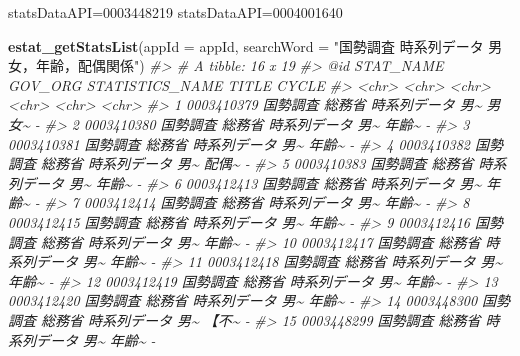 \documentclass[
  xelatex, ja=standard]{bxjsbook}
\newenvironment{Shaded}{\begin{snugshade}}{\end{snugshade}}
\newcommand{\AttributeTok}[1]{\textcolor[rgb]{0.13,0.29,0.53}{#1}}
\newcommand{\CommentTok}[1]{\textcolor[rgb]{0.56,0.35,0.01}{\textit{#1}}}
\newcommand{\FunctionTok}[1]{\textcolor[rgb]{0.13,0.29,0.53}{\textbf{#1}}}
\newcommand{\NormalTok}[1]{#1}
\newcommand{\StringTok}[1]{\textcolor[rgb]{0.31,0.60,0.02}{#1}}
\theoremstyle{definition}
\theoremstyle{definition}
\theoremstyle{definition}
\theoremstyle{definition}
\theoremstyle{remark}
\begin{document}
statsDataAPI=0003448219 statsDataAPI=0004001640

\begin{Shaded}
\begin{Highlighting}[]
\FunctionTok{estat\_getStatsList}\NormalTok{(}\AttributeTok{appId =}\NormalTok{ appId, }\AttributeTok{searchWord =} \StringTok{"国勢調査 時系列データ 男女，年齢，配偶関係"}\NormalTok{)}
\CommentTok{\#\textgreater{} \# A tibble: 16 x 19}
\CommentTok{\#\textgreater{}    \textasciigrave{}@id\textasciigrave{}      STAT\_NAME GOV\_ORG STATISTICS\_NAME  TITLE CYCLE}
\CommentTok{\#\textgreater{}    \textless{}chr\textgreater{}      \textless{}chr\textgreater{}     \textless{}chr\textgreater{}   \textless{}chr\textgreater{}            \textless{}chr\textgreater{} \textless{}chr\textgreater{}}
\CommentTok{\#\textgreater{}  1 0003410379 国勢調査  総務省  時系列データ 男\textasciitilde{} 男女\textasciitilde{} {-}    }
\CommentTok{\#\textgreater{}  2 0003410380 国勢調査  総務省  時系列データ 男\textasciitilde{} 年齢\textasciitilde{} {-}    }
\CommentTok{\#\textgreater{}  3 0003410381 国勢調査  総務省  時系列データ 男\textasciitilde{} 年齢\textasciitilde{} {-}    }
\CommentTok{\#\textgreater{}  4 0003410382 国勢調査  総務省  時系列データ 男\textasciitilde{} 配偶\textasciitilde{} {-}    }
\CommentTok{\#\textgreater{}  5 0003410383 国勢調査  総務省  時系列データ 男\textasciitilde{} 年齢\textasciitilde{} {-}    }
\CommentTok{\#\textgreater{}  6 0003412413 国勢調査  総務省  時系列データ 男\textasciitilde{} 年齢\textasciitilde{} {-}    }
\CommentTok{\#\textgreater{}  7 0003412414 国勢調査  総務省  時系列データ 男\textasciitilde{} 年齢\textasciitilde{} {-}    }
\CommentTok{\#\textgreater{}  8 0003412415 国勢調査  総務省  時系列データ 男\textasciitilde{} 年齢\textasciitilde{} {-}    }
\CommentTok{\#\textgreater{}  9 0003412416 国勢調査  総務省  時系列データ 男\textasciitilde{} 年齢\textasciitilde{} {-}    }
\CommentTok{\#\textgreater{} 10 0003412417 国勢調査  総務省  時系列データ 男\textasciitilde{} 年齢\textasciitilde{} {-}    }
\CommentTok{\#\textgreater{} 11 0003412418 国勢調査  総務省  時系列データ 男\textasciitilde{} 年齢\textasciitilde{} {-}    }
\CommentTok{\#\textgreater{} 12 0003412419 国勢調査  総務省  時系列データ 男\textasciitilde{} 年齢\textasciitilde{} {-}    }
\CommentTok{\#\textgreater{} 13 0003412420 国勢調査  総務省  時系列データ 男\textasciitilde{} 年齢\textasciitilde{} {-}    }
\CommentTok{\#\textgreater{} 14 0003448300 国勢調査  総務省  時系列データ 男\textasciitilde{} 【不\textasciitilde{} {-}    }
\CommentTok{\#\textgreater{} 15 0003448299 国勢調査  総務省  時系列データ 男\textasciitilde{} 年齢\textasciitilde{} {-}    }

\end{Highlighting}
\end{Shaded}
\end{document}
